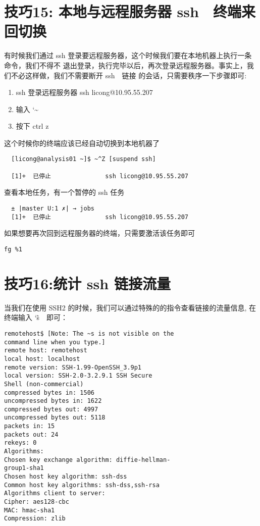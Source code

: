 \documentclass[UTF8]{ctexart}
\begin{document}
\section*{技巧15: 本地与远程服务器 ssh　终端来回切换}
有时候我们通过 ssh 登录要远程服务器，这个时候我们要在本地机器上执行一条命令，我们不得不
退出登录，执行完毕以后，再次登录远程服务器。事实上，我们不必这样做，我们不需要断开 ssh　链接
的会话，只需要秩序一下步骤即可:
\begin{enumerate}
  \item ssh 登录远程服务器 ssh licong@10.95.55.207
  \item 输入 \char`\~
  \item 按下 ctrl z
\end{enumerate}
这个时候你的终端应该已经自动切换到本地机器了
\begin{lstlisting}
  [licong@analysis01 ~]$ ~^Z [suspend ssh]

  [1]+  已停止               ssh licong@10.95.55.207  
\end{lstlisting}
查看本地任务，有一个暂停的 ssh 任务
\begin{lstlisting}
  ± |master U:1 ✗| → jobs 
  [1]+  已停止               ssh licong@10.95.55.207  
\end{lstlisting}
如果想要再次回到远程服务器的终端，只需要激活该任务即可
\begin{lstlisting}
fg %1
\end{lstlisting}


\section*{技巧16:统计 ssh 链接流量}
当我们在使用 SSH2 的时候，我们可以通过特殊的的指令查看链接的流量信息,
在终端输入  \char`\~s　即可：
\begin{lstlisting}
remotehost$ [Note: The ~s is not visible on the
command line when you type.]
remote host: remotehost
local host: localhost
remote version: SSH-1.99-OpenSSH_3.9p1
local version: SSH-2.0-3.2.9.1 SSH Secure
Shell (non-commercial)
compressed bytes in: 1506
uncompressed bytes in: 1622
compressed bytes out: 4997
uncompressed bytes out: 5118
packets in: 15
packets out: 24
rekeys: 0
Algorithms:
Chosen key exchange algorithm: diffie-hellman-
group1-sha1
Chosen host key algorithm: ssh-dss
Common host key algorithms: ssh-dss,ssh-rsa
Algorithms client to server:
Cipher: aes128-cbc
MAC: hmac-sha1
Compression: zlib
\end{lstlisting}
\end{document}
